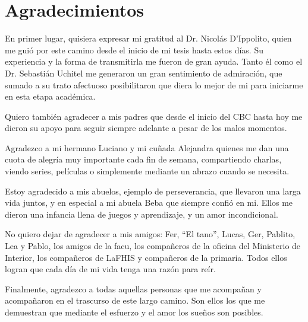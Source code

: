 \chapter*{Agradecimientos}

En primer lugar, quisiera expresar mi gratitud al Dr. Nicolás D'Ippolito, quien me guió por este camino desde el inicio de mi
tesis hasta estos días. Su experiencia y la forma de transmitirla me fueron de gran ayuda. Tanto él como el Dr.
Sebastián Uchitel me generaron un gran sentimiento de admiración, que sumado a su trato afectuoso posibilitaron que
diera lo mejor de mi para iniciarme en esta etapa académica.

Quiero también agradecer a mis padres que desde el inicio del CBC hasta hoy me dieron su apoyo para seguir siempre
adelante a pesar de los malos momentos.

Agradezco a mi hermano Luciano y mi cuñada Alejandra quienes me dan una cuota de alegría muy importante cada fin de
semana, compartiendo charlas, viendo series, películas o simplemente mediante un abrazo cuando se necesita.

Estoy agradecido a mis abuelos, ejemplo de perseverancia, que llevaron una larga vida juntos, y en especial a mi abuela
Beba que siempre confió en mi. Ellos me dieron una infancia llena de juegos y aprendizaje, y un amor incondicional.

No quiero dejar de agradecer a mis amigos: Fer, ``El tano'', Lucas, Ger, Pablito, Lea y Pablo, los amigos de la facu,
los compañeros de la oficina del Ministerio de Interior, los compañeros de LaFHIS y compañeros de la primaria. Todos
ellos logran que cada día de mi vida tenga una razón para reír.

Finalmente, agradezco a todas aquellas personas que me acompañan y acompañaron en el trascurso de este largo camino. Son
ellos los que me demuestran que mediante el esfuerzo y el amor los sueños son posibles.


